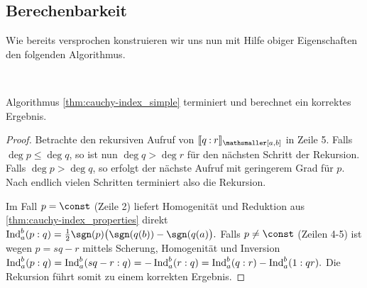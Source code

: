 \documentclass{mythesis}
\begin{document}
\subsection{Berechenbarkeit}


Wie bereits versprochen konstruieren wir uns nun mit Hilfe obiger Eigenschaften den folgenden Algorithmus.

\begin{algorithm} \label{thm:cauchy-index_simple}
     \\
    \begin{algorithmic}[1]
        \Else
             
        \EndIf
    \end{algorithmic}
\end{algorithm}

\begin{proposition}
    Algorithmus \ref{thm:cauchy-index_simple} terminiert und berechnet ein korrektes Ergebnis.
    \begin{proof}
        Betrachte den rekursiven Aufruf von $\Index{[a,b]}{q}{r}$ in Zeile 5.
        Falls $\deg p \le \deg q$, so ist nun $\deg q > \deg r$ für den nächsten Schritt der Rekursion.
        Falls $\deg p > \deg q$, so erfolgt der nächste Aufruf mit geringerem Grad für $p$.
        Nach endlich vielen Schritten terminiert also die Rekursion.

        Im Fall $p = \const$ (Zeile 2) liefert Homogenität und Reduktion aus \ref{thm:cauchy-index_properties} direkt
        \begin{math}
            \Ind_a^b(p:q) = \frac{1}{2} \sgn(p) \big(\sgn(q(b)) - \sgn(q(a)\big).
        \end{math}
        Falls $p \neq \const$ (Zeilen 4-5) ist wegen $p = sq - r$ mittels Scherung, Homogenität und Inversion
        \begin{math}
            \operatorname{Ind}_a^b(p:q) = \operatorname{Ind}_a^b(sq - r: q)
            = -\operatorname{Ind}_a^b(r : q)
            = \operatorname{Ind}_a^b(q : r) - \operatorname{Ind}_a^b(1 : qr).
        \end{math}
        Die Rekursion führt somit zu einem korrekten Ergebnis.
    \end{proof}
\end{proposition}
\end{document}
